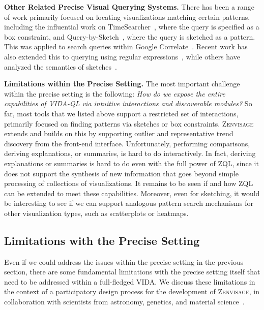 \documentclass[11pt]{article}
\newcommand{\stitle}[1]{\par\noindent\textbf{#1}}
\newcommand{\zv}{\textsc{Zenvisage}\xspace}
\newcommand{\vida}{\textsc{VIDA}\xspace}
\newcommand{\vidaql}{\textsc{VIDA-QL}\xspace}
\begin{document}
\stitle{Other Related Precise Visual Querying Systems.}
There has been a range of work primarily focused on locating visualizations
matching certain patterns, including the influential work
on TimeSearcher~\cite{hochheiser2004dynamic}, where the query is
specified as a box constraint, and 
Query-by-Sketch~\cite{wattenberg2001sketching}, where the query is 
sketched as a pattern. 
This was applied to search queries within Google Correlate~\cite{mohebbi2011google}. 
Recent work has also extended this to querying using regular
expressions~\cite{Zgraggen2015}, while
others have analyzed the semantics
of sketches~\cite{correll2016semantics,Mannino2018}.

\stitle{Limitations within the Precise Setting.}
The most important challenge within the precise setting
is the following: {\em How do we expose the entire capabilities of
 \vidaql via intuitive interactions and discoverable
modules?} So far, most tools that we listed above
support a restricted set of interactions,
primarily focused on finding patterns via sketches or box constraints. 
\zv extends and builds on this 
by supporting outlier and representative trend discovery
from the front-end interface. 
Unfortunately, performing comparisons, deriving explanations, or summaries,
is hard to do interactively. 
In fact, deriving explanations or summaries
is hard to do even with the full power of ZQL, since
it does not support the synthesis of new information
that goes beyond simple processing of collections of visualizations. 
It remains to be seen if and how ZQL can be extended to meet these capabilities.
Moreover, even for sketching, it would be interesting to see if
we can support analogous pattern search mechanisms
for other visualization types, such
as scatterplots
or heatmaps.


\subsection{Limitations with the Precise Setting}
\par Even if we could address 
the issues within the precise setting
in the previous section,
there are some fundamental limitations
with the precise setting itself 
that need to be addressed within a full-fledged \vida.
We discuss these limitations
in the context of a participatory 
design process for the development 
of \zv, in collaboration
with scientists from astronomy, genetics, 
and material science~\cite{Lee2017}. 
\end{document}
